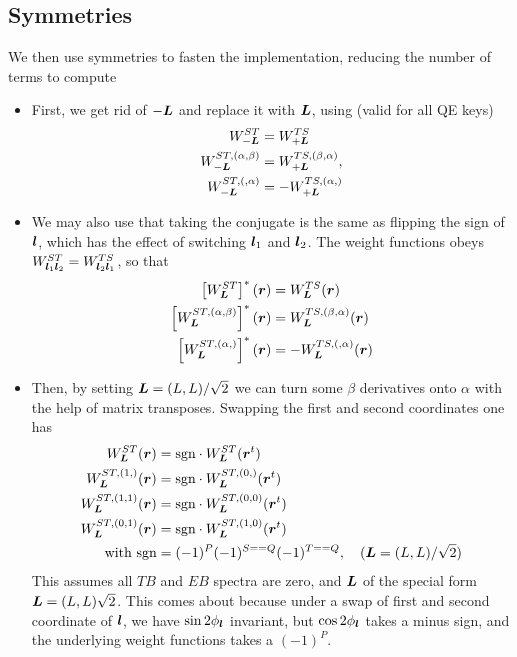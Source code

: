 \documentclass[prd, superscriptaddress, tightenlines, longbibliography, nofootinbib, eqsecnum, amsfonts, amsmath, floatfix, onecolumn, notitlepage]{revtex4-2}
\begin{document}
\subsection{Symmetries}
We then use symmetries to fasten the implementation, reducing the number of terms to compute
\begin{itemize}
	\item First, we get rid of $-\boldsymbol{L}$ and replace it with $\boldsymbol{L}$, using (valid for all QE keys)
\begin{equation}
\begin{split}
  W_{-\boldsymbol{L}}^{ST} &= W_{+\boldsymbol{L}}^{TS}\\
	W_{-\boldsymbol{L}}^{ST, (\alpha,\beta)} &= W_{+\boldsymbol{L}}^{TS, (\beta,\alpha)}, \\
	W_{-\boldsymbol{L}}^{ST, (,\alpha)} &= -W_{+\boldsymbol{L}}^{TS, (\alpha,)} \\
	\end{split}
	\end{equation}
\item We may also use that taking the conjugate is the same as flipping the sign of $\boldsymbol{l}$, which has the effect of switching $\boldsymbol{l}_1$ and $\boldsymbol{l}_2$. The weight functions obeys $W^{ST}_{\boldsymbol{l}_1\boldsymbol{l}_2} = W_{\boldsymbol{l}_2\boldsymbol{l}_1}^{TS}$, so that
\begin{equation}
\begin{split}
	\left[W_{\boldsymbol{L}}^{ST}\right]^*(\boldsymbol{r}) &= W_{\boldsymbol{L}}^{TS}(\boldsymbol{r}) \\
	\left[W_{\boldsymbol{L}}^{ST, (\alpha, \beta)}\right]^*(\boldsymbol{r}) &= W_{\boldsymbol{L}}^{TS, (\beta, \alpha)}(\boldsymbol{r}) \\
		\left[W_{\boldsymbol{L}}^{ST, (\alpha,)}\right]^*(\boldsymbol{r}) &= -W_{\boldsymbol{L}}^{TS, (, \alpha)}(\boldsymbol{r}) \\
\end{split}
\end{equation}
\item Then, by setting $\boldsymbol{L} = (L,L)/\sqrt{2}$ we can turn some $\beta$ derivatives onto $\alpha$ with the help of matrix transposes. Swapping the first and second coordinates one has
\begin{equation}
\begin{split}
	W_{\boldsymbol{L}}^{ST}(\boldsymbol{r})& = \textrm{sgn}\cdot W^{ST}_{\boldsymbol{L}}({\boldsymbol{r}}^t) \\
	W_{\boldsymbol{L}}^{ST, (1,)}(\boldsymbol{r})& = \textrm{sgn}\cdot  W_{\boldsymbol{L}}^{ST, (0,)}(\boldsymbol{r}^t) \\
		W_{\boldsymbol{L}}^{ST, (1, 1)}(\boldsymbol{r})& = \textrm{sgn}\cdot  W_{\boldsymbol{L}}^{ST, (0,0)}(\boldsymbol{r}^t) \\
				W_{\boldsymbol{L}}^{ST, (0,1)}(\boldsymbol{r})& = \textrm{sgn}\cdot  W_{\boldsymbol{L}}^{ST, (1,0)}(\boldsymbol{r}^t) \\
		\textrm{ with sgn} &= (-1)^P (-1)^{S == Q} (-1)^{T == Q},\quad  (\boldsymbol{L} = (L,L)/\sqrt{2})\end{split}
\end{equation}
This assumes all $TB$ and $EB$ spectra are zero, and $\boldsymbol{L}$ of the special form   $\boldsymbol{L} = (L,L)\sqrt{2}$. This comes about because under a swap of first and second coordinate of $\boldsymbol{l}$, we have $\sin 2\phi_{\boldsymbol{l}}$ invariant, but $\cos 2\phi_{\boldsymbol{l}}$ takes a minus sign, and the underlying weight functions takes a $(-1)^P$.
\end{itemize}
\end{document}
